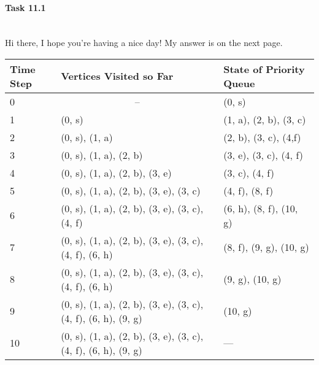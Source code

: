 \documentclass[11pt]{article}
\begin{document}
\paragraph{Task 11.1}
\\Hi there, I hope you're having a nice day! My answer is on the next page.
\begin{table}[]
	\begin{tabular}{|l|l|l|}
		\hline
		Time Step & Vertices Visited so Far                                        & State of Priority Queue \\ \hline
		0         & \multicolumn{1}{c|}{--}                                        & (0, s)                  \\ \hline
		1         & (0, s)                                                         & (1, a), (2, b), (3, c)  \\ \hline
		2         & (0, s), (1, a)                                                 & (2, b), (3, c), (4,f)   \\ \hline
		3         & (0, s), (1, a), (2, b)                                         & (3, e), (3, c), (4, f)  \\ \hline
		4         & (0, s), (1, a), (2, b), (3, e)                                 & (3, c), (4, f)          \\ \hline
		5         & (0, s), (1, a), (2, b), (3, e), (3, c)                         & (4, f), (8, f)          \\ \hline
		6         & (0, s), (1, a), (2, b), (3, e), (3, c), (4, f)                 & (6, h), (8, f), (10, g) \\ \hline
		7         & (0, s), (1, a), (2, b), (3, e), (3, c), (4, f), (6, h)         & (8, f), (9, g), (10, g) \\ \hline
		8         & (0, s), (1, a), (2, b), (3, e), (3, c), (4, f), (6, h)         & (9, g), (10, g)         \\ \hline
		9         & (0, s), (1, a), (2, b), (3, e), (3, c), (4, f), (6, h), (9, g) & (10, g)                 \\ \hline
		10        & (0, s), (1, a), (2, b), (3, e), (3, c), (4, f), (6, h), (9, g) & ---                     \\ \hline
	\end{tabular}
\end{table}










\label{mylastpagelabel}
\end{document}
